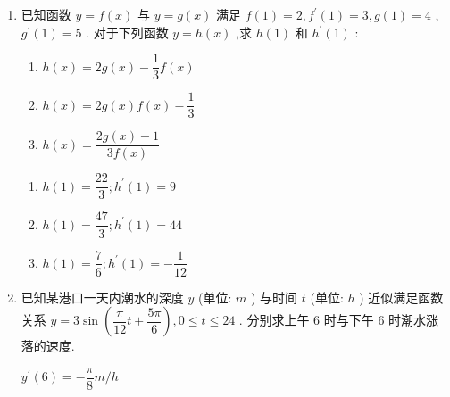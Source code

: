\begin{enumerate}
\begin{jieda}
\begin{enumerate}
            \item ${y}^{\prime } = 2{e}^{2x+1} \sin x + {e}^{2x+1}\cos x = \left( {2\sin x + \cos x}\right) {e}^{2x+1}$ .
            
            \item ${f}^{\prime }\left( x\right)  = -\dfrac{5}{3}{\left( -x + 5\right) }^{\frac{2}{3}}$ .
            
            \item $f'\left( x\right)  = \dfrac{{2x}\left( {1 - \ln \left( {3x}\right) }\right)  + 1}{x{\left( 2x + 1\right) }^{2}}$ .
        \end{enumerate}
    \end{jieda}
    \item 已知函数 $y = f\left( x\right)$ 与 $y = g\left( x\right)$ 满足 $f\left( 1\right)  = 2,{f}^{\prime }\left( 1\right)  = 3,g\left( 1\right)  = 4$ , ${{g}}^{\prime }\left( {1}\right)  = 5$ . 对于下列函数 ${y} = {h}\left( {x}\right)$ ,求 ${h}\left( {1}\right)$ 和 ${{h}}^{\prime }\left( {1}\right)$ :
    \begin{enumerate}
        \item ${h}\left( {x}\right)  = 2{g}\left( {x}\right)  - \dfrac{1}{3}{f}\left( {x}\right)$
        \item ${h}\left( {x}\right)  = 2{g}\left( {x}\right) {f}\left( {x}\right)  - \dfrac{1}{3}$
        \item ${h}\left( {x}\right)  = \dfrac{2{g}\left( {x}\right)  - {1}}{3{f}\left( {x}\right) }$
    \end{enumerate}
    \begin{jieda}
        \begin{enumerate}
            \item $h\left( 1\right)  = \dfrac{22}{3};{h}^{\prime }\left( 1\right)  = 9$
            \item $h\left( 1\right)  = \dfrac{47}{3};{h}^{\prime }\left( 1\right)  = {44}$
            \item $h\left( 1\right)  = \dfrac{7}{6};{h}^{\prime }\left( 1\right)  =  - \dfrac{1}{12}$
        \end{enumerate}
    \end{jieda}
    \item 已知某港口一天内潮水的深度 ${y}$ (单位: ${m}$ ) 与时间 ${t}$ (单位: ${h}$ ) 近似满足函数关系 $y = 3\sin \left( {\dfrac{\pi }{12}t + \dfrac{5\pi }{6}}\right) ,0 \leq  t \leq  {24}$ . 分别求上午 6 时与下午 6 时潮水涨落的速度.
    \begin{jieda}
        ${y}^{\prime }\left( 6\right)  =  - \dfrac{\pi }{8}{m}/{h}$
        

\end{jieda}
\end{enumerate}
